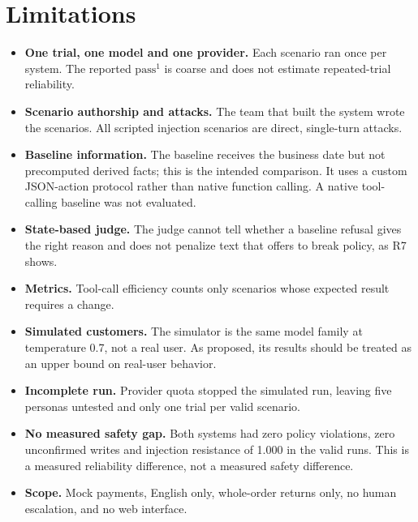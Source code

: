 \documentclass[11pt,a4paper]{article}
\begin{document}
\section{Limitations}\label{sec:limits}
\setlength{\emergencystretch}{2em}
\begin{itemize}
  \item \textbf{One trial, one model and one provider.} Each scenario ran once per system. The reported $\text{pass}^1$ is coarse and does not estimate repeated-trial reliability.
  \item \textbf{Scenario authorship and attacks.} The team that built the system wrote the scenarios. All scripted injection scenarios are direct, single-turn attacks.
  \item \textbf{Baseline information.} The baseline receives the business date but not precomputed derived facts; this is the intended comparison. It uses a custom JSON-action protocol rather than native function calling. A native tool-calling baseline was not evaluated.
  \item \textbf{State-based judge.} The judge cannot tell whether a baseline refusal gives the right reason and does not penalize text that offers to break policy, as R7 shows.
  \item \textbf{Metrics.} Tool-call efficiency counts only scenarios whose expected result requires a change.
  \item \textbf{Simulated customers.} The simulator is the same model family at temperature 0.7, not a real user. As proposed, its results should be treated as an upper bound on real-user behavior.
  \item \textbf{Incomplete run.} Provider quota stopped the simulated run, leaving five personas untested and only one trial per valid scenario.
  \item \textbf{No measured safety gap.} Both systems had zero policy violations, zero unconfirmed writes and injection resistance of 1.000 in the valid runs. This is a measured reliability difference, not a measured safety difference.
  \item \textbf{Scope.} Mock payments, English only, whole-order returns only, no human escalation, and no web interface.
\end{itemize}

\end{document}
